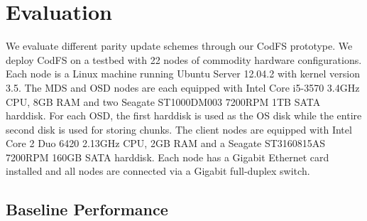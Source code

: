 \chapter{Evaluation}
\label{chap:evaluation}

We evaluate different parity update schemes through our CodFS prototype. We
deploy CodFS on a testbed with 22 nodes of commodity hardware configurations.
Each node is a Linux machine running Ubuntu Server 12.04.2 with kernel version
3.5. The MDS and OSD nodes are each equipped with Intel Core i5-3570 3.4GHz
CPU, 8GB RAM and two Seagate
ST1000DM003 7200RPM 1TB SATA harddisk. For each OSD, the first harddisk is used
as the OS disk while the entire second disk is used for storing chunks. The
client nodes are equipped with Intel Core 2 Duo 6420 2.13GHz CPU, 2GB RAM and a
Seagate ST3160815AS 7200RPM 160GB SATA harddisk. Each node has a Gigabit
Ethernet card installed and all nodes are connected via a Gigabit full-duplex
switch.

\section{Baseline Performance}
\label{sec:evaluation_baseline}

